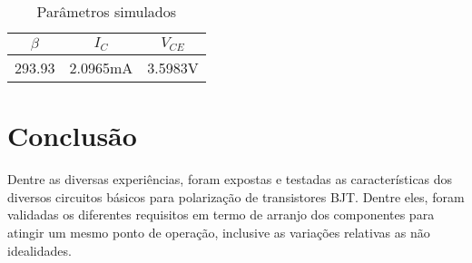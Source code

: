 \documentclass[a4paper]{report}
\begin{document}
\begin{table}[!h]
    \centering
    \begin{tabular}{|c|c|c|}
    \hline
         $\beta$	&	$I_C$	&	$V_{CE}$	\\	\hline
293.93	&	2.0965mA	&	3.5983V	\\	\hline

    \end{tabular}
    \caption{Parâmetros simulados}
    \label{tab:Q3b}
\end{table}


\section{Conclusão}

Dentre as diversas experiências, foram expostas e testadas as características dos diversos circuitos básicos para polarização de transistores BJT. Dentre eles, foram validadas os diferentes requisitos em termo de arranjo dos componentes para atingir um mesmo ponto de operação, inclusive as variações relativas as não idealidades.
\end{document}
